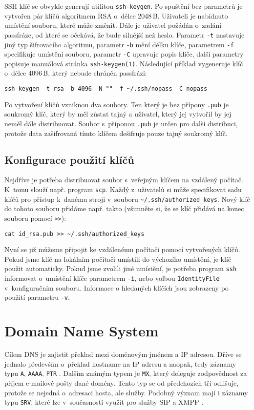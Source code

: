 SSH klíč se obvykle generují utilitou {\tt ssh-keygen}. Po spuštění bez parametrů je vytvořen pár klíčů algoritmem RSA o~délce 2048\,B. Uživateli je nabídnuto umístění souboru,
které může změnit. Dále je uživatel požádán o~zadání passfráze, od které se očekává, že bude silnější než heslo. Parametr {\tt -t} nastavuje jiný typ šifrovacího
algoritmu, parametr {\tt -b} mění délku klíče, parametrem {\tt -f} specifikuje umístění souboru, parametr {\tt -C} upravuje popis klíče, další
parametry popisuje manuálová stránka {\tt ssh-keygen(1)}. Následující příklad vygeneruje klíč o~délce 4096\,B, který nebude chráněn passfrázi:

\begin{verbatim}
ssh-keygen -t rsa -b 4096 -N "" -f ~/.ssh/nopass -C nopass
\end{verbatim}

Po vytvoření klíčů vzniknou dva soubory. Ten který je bez přípony {\tt .pub} je soukromý klíč, který by měl zůstat tajný a uživatel, který jej vytvořil by jej neměl dále distribuovat.
Soubor s~příponou {\tt .pub} je určen pro další distribuci, protože data zašifrovaná tímto klíčem dešifruje pouze tajný soukromý klíč.

\subsection{Konfigurace použití klíčů}

Nejdříve je potřeba distribuovat soubor s~veřejným klíčem na vzdálený počítač. K~tomu slouží např. program {\tt scp}. Každý z~uživatelů si může specifikovat sadu klíčů pro
přístup k~danému stroji v~souboru \verb|~/.ssh/authorized_keys|. Nový klíč do tohoto souboru přidáme např. takto (všimněte si, že se klíč přidává na konec souboru
pomocí \verb|>>|):

\begin{verbatim}
cat id_rsa.pub >> ~/.ssh/authorized_keys
\end{verbatim}

Nyní se již můžeme připojit ke vzdálenému počítači pomocí vytvořených klíčů. Pokud jsme klíč na lokálním počítači umístili do výchozího umístění, je klíč použit automaticky. Pokud jsme
zvolili jiné umístění, je potřeba program {\tt ssh} informovat o~umístění klíče parametrem {\tt -i}, nebo volbou {\tt IdentityFile} v~konfiguračním souboru. Informace o hledaných
klíčích jsou zobrazeny po použití parametru {\tt -v}.


\section{Domain Name System}
\label{dns}
Cílem DNS je zajistit překlad mezi doménovým jménem a IP adresou. Dříve se jednalo především o~překlad hostname na IP adresu a naopak, tedy záznamy typu {\tt A}, {\tt AAAA}, {\tt PTR} \cite{rfc1035,rfc3596}. Dalším známým typem je {\tt MX}, který deleguje zodpovědnost za příjem e-mailové pošty dané domény. Tento typ se od předchozích tří odlišuje, protože se nejedná o~adresaci hosta, ale služby. Podobný význam mají i záznamy typu {\tt SRV}, které lze v~současnosti využít pro služby SIP a XMPP \cite{rfc2782}.

